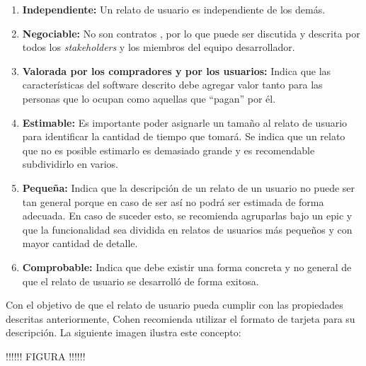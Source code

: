 \begin{enumerate}
  \item \textbf{Independiente:} Un relato de usuario es independiente de los demás.
  \item \textbf{Negociable:} No son contratos , por lo que puede ser discutida y descrita por todos los \textit{stakeholders} y los miembros del equipo desarrollador.
  \item \textbf{Valorada por los compradores y por los usuarios:} Indica que las características del software descrito debe agregar valor tanto para las personas que lo ocupan como aquellas que “pagan” por él.
  \item \textbf{Estimable:} Es importante poder asignarle un tamaño al relato de usuario para identificar la cantidad de tiempo que tomará. Se indica que un relato que no es posible estimarlo es demasiado grande y es recomendable subdividirlo en varios.
  \item \textbf{Pequeña:} Indica que la descripción de un relato de un usuario no puede ser tan general porque en caso de ser así no podrá ser estimada de forma adecuada. En caso de suceder esto, se recomienda agruparlas bajo un epic  y que la funcionalidad  sea dividida en relatos de usuarios más pequeños y con mayor cantidad de detalle.
  \item \textbf{Comprobable:} Indica que debe existir una forma concreta y no general de que el relato de usuario se desarrolló de forma exitosa.
\end{enumerate}

Con el objetivo de que el relato de usuario pueda cumplir con las propiedades descritas anteriormente, Cohen recomienda utilizar el formato de tarjeta para su descripción. La siguiente imagen ilustra este concepto:

!!!!!! FIGURA !!!!!!

